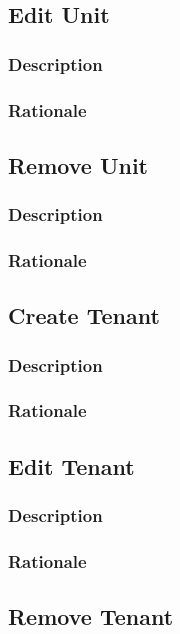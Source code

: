\documentclass{scrreprt}
\begin{document}
\subsection{Edit Unit}
\subsubsection{Description}

\subsubsection{Rationale}

\subsection{Remove Unit}
\subsubsection{Description}

\subsubsection{Rationale}

\subsection{Create Tenant}
\subsubsection{Description}

\subsubsection{Rationale}

\subsection{Edit Tenant}
\subsubsection{Description}

\subsubsection{Rationale}

\subsection{Remove Tenant}
\end{document}

